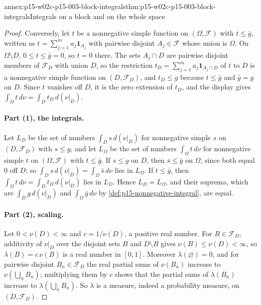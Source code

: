 \begin{annexitem}{annex:p15-w02c-p15-003-block-integrals}{thm:p15-w02c-p15-003-block-integrals}{Integrals on a block and on the whole space}
\begin{proof}
Conversely, let \(t\) be a nonnegative simple function on
\((\Omega,\mathcal F)\) with \(t\leq\bar g\), written as
\(t=\sum_{j=1}^ma_j\mathbf1_{A_j}\) with pairwise disjoint
\(A_j\in\mathcal F\) whose union is \(\Omega\). On \(\Omega\setminus D\),
\(0\leq t\leq\bar g=0\), so \(t=0\) there. The sets \(A_j\cap D\) are
pairwise disjoint members of \(\mathcal F_D\) with union \(D\), so the
restriction \(t_D=\sum_{j=1}^ma_j\mathbf1_{A_j\cap D}\) of \(t\) to \(D\) is
a nonnegative simple function on \((D,\mathcal F_D)\), and \(t_D\leq g\)
because \(t\leq\bar g\) and \(\bar g=g\) on \(D\). Since \(t\) vanishes
off \(D\), it is the zero extension of \(t_D\), and the display gives
\(\int_\Omega t\,d\nu=\int_Dt_D\,d(\nu|_D)\).

\paragraph{Part (1), the integrals.}
Let \(L_D\) be the set of numbers \(\int_Ds\,d(\nu|_D)\) for nonnegative
simple \(s\) on \((D,\mathcal F_D)\) with \(s\leq g\), and let
\(L_\Omega\) be the set of numbers \(\int_\Omega t\,d\nu\) for nonnegative
simple \(t\) on \((\Omega,\mathcal F)\) with \(t\leq\bar g\). If \(s\leq g\)
on \(D\), then \(\bar s\leq\bar g\) on \(\Omega\), since both equal \(0\)
off \(D\); so \(\int_Ds\,d(\nu|_D)=\int_\Omega\bar s\,d\nu\) lies in
\(L_\Omega\). If \(t\leq\bar g\), then
\(\int_\Omega t\,d\nu=\int_Dt_D\,d(\nu|_D)\) lies in \(L_D\). Hence
\(L_D=L_\Omega\), and their suprema, which are \(\int_Dg\,d(\nu|_D)\) and
\(\int_\Omega\bar g\,d\nu\) by \cref{def:p15-nonnegative-integral}, are
equal.

\paragraph{Part (2), scaling.}
Let \(0<\nu(D)<\infty\) and \(c=1/\nu(D)\), a positive real number. For
\(B\in\mathcal F_D\), additivity of \(\nu|_D\) over the disjoint sets \(B\)
and \(D\setminus B\) gives \(\nu(B)\leq\nu(D)<\infty\), so
\(\lambda(B)=c\,\nu(B)\) is a real number in \([0,1]\). Moreover
\(\lambda(\varnothing)=0\), and for pairwise disjoint
\(B_n\in\mathcal F_D\) the real partial sums of \(\nu(B_n)\) increase to
\(\nu(\bigcup_nB_n)\); multiplying them by \(c\) shows that the partial sums
of \(\lambda(B_n)\) increase to \(\lambda(\bigcup_nB_n)\). So \(\lambda\) is
a measure, indeed a probability measure, on \((D,\mathcal F_D)\).


\end{proof}
\end{annexitem}
